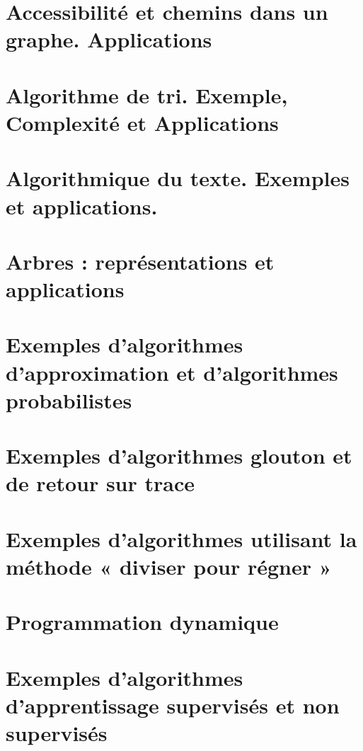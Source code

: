 \chapter{Accessibilité et chemins dans un graphe. Applications}
\label{L7}


\chapter{Algorithme de tri. Exemple, Complexité et Applications}
\label{L8}


\chapter{Algorithmique du texte. Exemples et applications.}
\label{L9}


\chapter{Arbres : représentations et applications}
\label{L10}


\chapter{Exemples d'algorithmes d'approximation et d'algorithmes probabilistes}
\label{L11}


\chapter{Exemples d'algorithmes glouton et de retour sur trace}
\label{L12}


\chapter{Exemples d’algorithmes utilisant la méthode « diviser pour régner »}
\label{L13}
	

\chapter{Programmation dynamique} \label{L14}


\chapter{Exemples d’algorithmes d’apprentissage supervisés et non supervisés} \label{L15}


